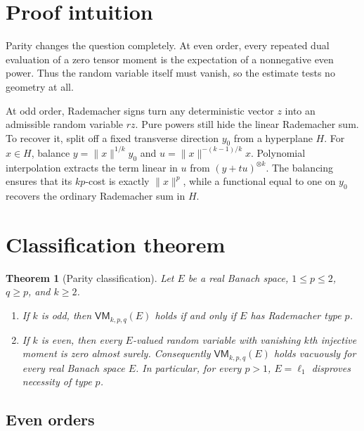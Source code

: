 \documentclass[11pt]{article}
\newtheorem{theorem}{Theorem}
\begin{document}
\section{Proof intuition}

Parity changes the question completely.  At even order, every repeated dual
evaluation of a zero tensor moment is the expectation of a nonnegative even
power.  Thus the random variable itself must vanish, so the estimate tests no
geometry at all.

At odd order, Rademacher signs turn any deterministic vector $z$ into an
admissible random variable $rz$.  Pure powers still hide the linear
Rademacher sum.  To recover it, split off a fixed transverse direction $y_0$
from a hyperplane $H$.  For $x\in H$, balance
$y=\|x\|^{1/k}y_0$ and
$u=\|x\|^{-(k-1)/k}x$.  Polynomial interpolation extracts the term linear in
$u$ from $(y+tu)^{\otimes k}$.  The balancing ensures that its $kp$-cost is
exactly $\|x\|^p$, while a functional equal to one on $y_0$ recovers the
ordinary Rademacher sum in $H$.

\section{Classification theorem}

\begin{theorem}[Parity classification]\label{thm:main}
Let $E$ be a real Banach space, $1\le p\le2$, $q\ge p$, and $k\ge2$.
\begin{enumerate}
\item If $k$ is odd, then $\mathsf{VM}_{k,p,q}(E)$ holds if and only if $E$
has Rademacher type $p$.
\item If $k$ is even, then every $E$-valued random variable with vanishing
$k$th injective moment is zero almost surely.  Consequently
$\mathsf{VM}_{k,p,q}(E)$ holds vacuously for every real Banach space $E$.
In particular, for every $p>1$, $E=\ell_1$ disproves necessity of type $p$.
\end{enumerate}
\end{theorem}

\subsection*{Even orders}
\end{document}
